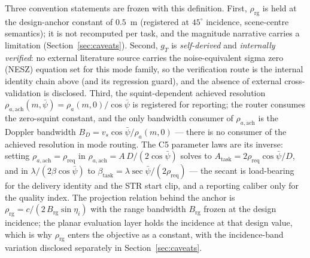 \documentclass[preprint,authoryear]{elsarticle}
\begin{document}
Three convention statements are frozen with this definition. First, $\rho_{\mathrm{rg}}$ is held at the design-anchor constant of $0.5$~m (registered at $45^{\circ}$ incidence, scene-centre semantics); it is not recomputed per task, and the magnitude narrative carries a limitation (Section~\ref{sec:caveats}). Second, $g_T$ is \emph{self-derived} and \emph{internally verified}: no external literature source carries the noise-equivalent sigma zero (NESZ) equation set for this mode family, so the verification route is the internal identity chain above (and its regression guard), and the absence of external cross-validation is disclosed. Third, the squint-dependent achieved resolution $\rho_{a,\mathrm{ach}}(m,\bar\psi)=\rho_a(m,0)/\cos\bar\psi$ is registered for reporting; the router consumes the zero-squint constant, and the only bandwidth consumer of $\rho_{a,\mathrm{ach}}$ is the Doppler bandwidth $B_D=v_s\cos\bar\psi/\rho_a(m,0)$ --- there is no consumer of the achieved resolution in mode routing. The C5 parameter laws are its inverse: setting $\rho_{a,\mathrm{ach}}=\rho_{\mathrm{req}}$ in $\rho_{a,\mathrm{ach}}=A\,D/(2\cos\bar\psi)$ solves to $A_{\mathrm{task}}=2\rho_{\mathrm{req}}\cos\bar\psi/D$, and in $\lambda/(2\beta\cos\bar\psi)$ to $\beta_{\mathrm{task}}=\lambda\sec\bar\psi/(2\rho_{\mathrm{req}})$ --- the secant is load-bearing for the delivery identity and the STR start clip, and a reporting caliber only for the quality index. The projection relation behind the anchor is $\rho_{\mathrm{rg}}=c/(2\,B_{\mathrm{rg}}\sin\eta_i)$ with the range bandwidth $B_{\mathrm{rg}}$ frozen at the design incidence; the planar evaluation layer holds the incidence at that design value, which is why $\rho_{\mathrm{rg}}$ enters the objective as a constant, with the incidence-band variation disclosed separately in Section~\ref{sec:caveats}.
\end{document}
